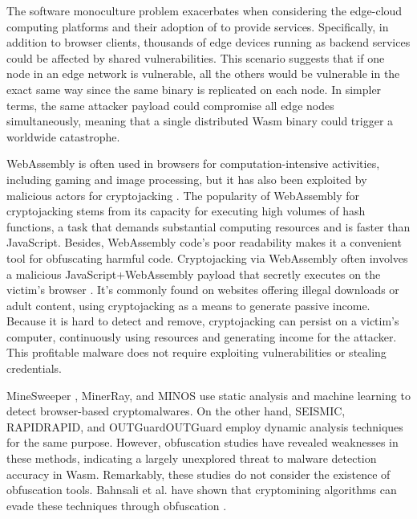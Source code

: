 The software monoculture problem exacerbates when considering the edge-cloud computing platforms and their adoption of \Wasm to provide services.
Specifically, in addition to browser clients, thousands of edge devices running \Wasm as backend services could be affected by shared vulnerabilities. 
This scenario suggests that if one node in an edge network is vulnerable, all the others would be vulnerable in the exact same way since the same binary is replicated on each node. 
In simpler terms, the same attacker payload could compromise all edge nodes simultaneously, meaning that a single distributed Wasm binary could trigger a worldwide catastrophe.



WebAssembly is often used in browsers for computation-intensive activities, including gaming and image processing, but it has also been exploited by malicious actors for cryptojacking \cite{10.1145/3339252.3339261}.
The popularity of WebAssembly for cryptojacking stems from its capacity for executing high volumes of hash functions, a task that demands substantial computing resources and is faster than JavaScript.
Besides, WebAssembly code's poor readability makes it a convenient tool for obfuscating harmful code.
Cryptojacking via WebAssembly often involves a malicious JavaScript+WebAssembly payload that secretly executes on the victim's browser \cite{9566204}.
It's commonly found on websites offering illegal downloads or adult content, using cryptojacking as a means to generate passive income.
Because it is hard to detect and remove, cryptojacking can persist on a victim's computer, continuously using resources and generating income for the attacker.
This profitable malware does not require exploiting vulnerabilities or stealing credentials.

MineSweeper \cite{Minesweeper}, MinerRay\cite{MinerRay}, and MINOS\cite{MINOS} use static analysis and machine learning to detect browser-based cryptomalwares.
On the other hand, SEISMIC\cite{SEISMIC}, RAPIDRAPID\cite{RAPID}, and OUTGuardOUTGuard\cite{outguard} employ dynamic analysis techniques for the same purpose.
However, obfuscation studies have revealed weaknesses in these methods, indicating a largely unexplored threat to malware detection accuracy in Wasm.
Remarkably, these studies do not consider the existence of obfuscation tools.
Bahnsali et al. have shown that cryptomining algorithms can evade these techniques through obfuscation \cite{10.1145/3507657.3528560}.





